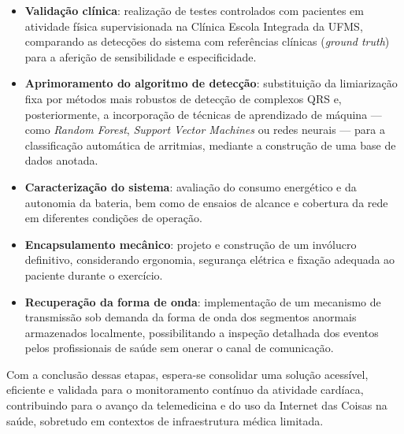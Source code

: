 \begin{itemize}
    \item \textbf{Validação clínica}: realização de testes controlados com pacientes em atividade física supervisionada na Clínica Escola Integrada da \acs{UFMS}, comparando as detecções do sistema com referências clínicas (\textit{ground truth}) para a aferição de sensibilidade e especificidade.

    \item \textbf{Aprimoramento do algoritmo de detecção}: substituição da limiarização fixa por métodos mais robustos de detecção de complexos QRS e, posteriormente, a incorporação de técnicas de aprendizado de máquina — como \textit{Random Forest}, \textit{Support Vector Machines} ou redes neurais — para a classificação automática de arritmias, mediante a construção de uma base de dados anotada.

    \item \textbf{Caracterização do sistema}: avaliação do consumo energético e da autonomia da bateria, bem como de ensaios de alcance e cobertura da rede em diferentes condições de operação.

    \item \textbf{Encapsulamento mecânico}: projeto e construção de um invólucro definitivo, considerando ergonomia, segurança elétrica e fixação adequada ao paciente durante o exercício.

    \item \textbf{Recuperação da forma de onda}: implementação de um mecanismo de transmissão sob demanda da forma de onda dos segmentos anormais armazenados localmente, possibilitando a inspeção detalhada dos eventos pelos profissionais de saúde sem onerar o canal de comunicação.
\end{itemize}

Com a conclusão dessas etapas, espera-se consolidar uma solução acessível, eficiente e validada para o monitoramento contínuo da atividade cardíaca, contribuindo para o avanço da telemedicina e do uso da Internet das Coisas na saúde, sobretudo em contextos de infraestrutura médica limitada.

